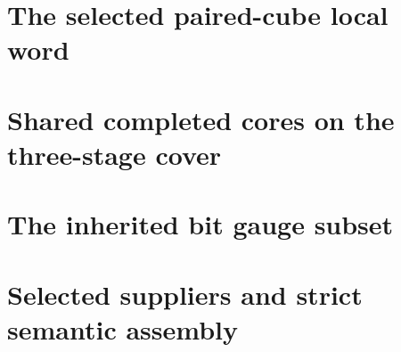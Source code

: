 \documentclass[11pt]{article}
\begin{document}
\section{The selected paired-cube local word}

\section{Shared completed cores on the three-stage cover}

\section{The inherited bit gauge subset}

\section{Selected suppliers and strict semantic assembly}

\end{document}
